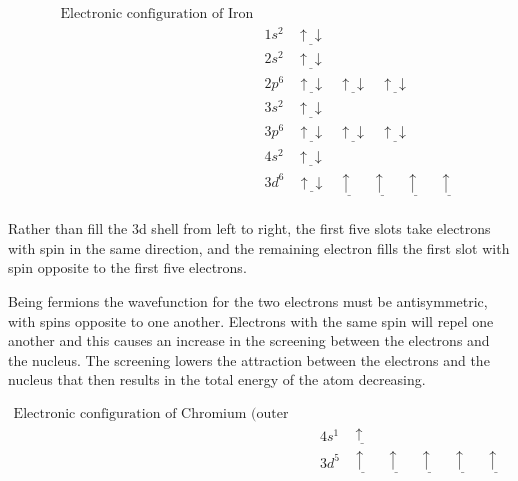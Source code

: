 \begin{equation}
\begin{split}
\text{Electronic configuration of Iron}\\
&1s^2 \:\:\:\: \underline{\uparrow \downarrow} \\
&2s^2 \:\:\:\: \underline{\uparrow \downarrow} \\
&2p^6 \:\:\:\: \underline{\uparrow \downarrow} \:\:\:\:  \underline{\uparrow  \downarrow} \:\:\:\:  \underline{\uparrow  \downarrow} \\
&3s^2 \:\:\:\: \underline{\uparrow \downarrow} \\
&3p^6 \:\:\:\: \underline{\uparrow \downarrow} \:\:\:\:  \underline{\uparrow \downarrow} \:\:\:\:  \underline{\uparrow \downarrow} \\
&4s^2 \:\:\:\: \underline{\uparrow \downarrow} \\
&3d^6 \:\:\:\: \underline{\uparrow \downarrow} \:\:\:\:  \underline{\uparrow \:\:} \:\:\:\:  \underline{\uparrow \:\:} \:\:\:\: \underline{\uparrow \:\:} \:\:\:\: \underline{\uparrow \:\:}\\
\end{split}
\label{eq:fullironconfiguration}
\end{equation}

Rather than fill the 3d shell from left to right, the first five slots take electrons with spin in the same direction, and the remaining electron fills the first slot with spin opposite to the first five electrons.

Being fermions the wavefunction for the two electrons must be antisymmetric, with spins opposite to one another.  Electrons with the same spin will repel one another and this causes an increase in the screening between the electrons and the nucleus.  The screening lowers the attraction between the electrons and the nucleus that then results in the total energy of the atom decreasing\cite{aligningelectrons}.

\begin{equation}
\begin{split}
\text{Electronic configuration of Chromium (outer shells)}\\
&4s^1 \:\:\:\:  \underline{\uparrow \:\:} \\
&3d^5 \:\:\:\:  \underline{\uparrow \:\:} \:\:\:\:  \underline{\uparrow \:\:} \:\:\:\:  \underline{\uparrow \:\:} \:\:\:\: \underline{\uparrow \:\:} \:\:\:\: \underline{\uparrow \:\:}
\end{split}
\label{eq:chromiumconfig}
\end{equation}

